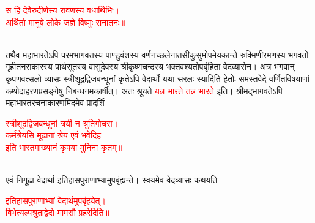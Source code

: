 \centering\textcolor{red}{स हि देवैरुदीर्णस्य रावणस्य वधार्थिभिः। 	\nopagebreak\\
अर्थितो मानुषे लोके जज्ञे विष्णुः सनातनः॥}\nopagebreak\\
\\
\begin{sloppypar}\justifying\noindent\hspace{10mm} तथैव महाभारतेऽपि परम\-भागवतस्य पाण्डु\-वंशस्य वर्णनच्छलेनातसी\-कुसुमोपमेय\-कान्ते रुक्मिणी\-रमणस्य भगवतो गृहीत\-नराकारस्य पार्थ\-सूतस्य वासुदेवस्य श्री\-कृष्ण\-चन्द्रस्य भक्त\-वश्यतोप\-बृंहिता वेदव्यासेन। अत्र भगवान् कृपण\-वत्सलो व्यासः स्त्री\-शूद्र\-द्विज\-बन्धूनां कृतेऽपि वेदार्थो यथा सरलः स्यादिति हेतोः
समस्त\-वेदे वर्णित\-विषयाणां कथोदाहरण\-प्रसङ्गेषु निबन्धनमकार्षीत्। अतः श्रूयते \textcolor{red}{यन्न भारते तन्न भारते} इति। श्रीमद्भागवतेऽपि महाभारत\-रचना\-कारणमिदमेव प्रादर्शि	~–\end{sloppypar}
\centering\textcolor{red}{स्त्रीशूद्रद्विजबन्धूनां त्रयी न श्रुतिगोचरा। \nopagebreak\\
कर्मश्रेयसि मूढानां श्रेय एवं भवेदिह। \nopagebreak\\
इति भारतमाख्यानं कृपया मुनिना कृतम्॥}\nopagebreak\\
\\
\begin{sloppypar}\justifying\noindent\hspace{10mm} एवं निगूढा वेदार्था इतिहास\-पुराणाभ्यामुप\-बृंह्यन्ते। स्वयमेव वेदव्यासः कथयति~–\end{sloppypar}
\centering\textcolor{red}{इतिहासपुराणाभ्यां वेदार्थमुपबृंहयेत्। \nopagebreak\\
बिभेत्यल्पश्रुताद्वेदो मामसौ प्रहरेदिति॥}\nopagebreak\\
\\
